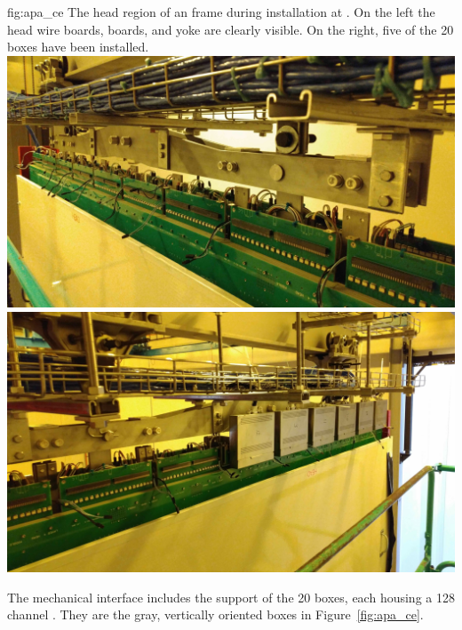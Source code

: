 \begin{dunefigure}{fig:apa_ce}
{The head region of an  frame during installation at .  On the left the head wire boards,  boards, and yoke are clearly visible. On the right, five of the 20  boxes have been installed.}
\includegraphics[height=0.2\textheight]{graphics/sp-apa-yolk-photo.jpg}
\includegraphics[height=0.2\textheight]{graphics/sp-apa-ceboxes-photo.jpg}
\end{dunefigure}

The mechanical interface includes the support of the \num{20}  boxes, each housing a \num{128} channel .  They are the gray, vertically oriented boxes  in Figure~\ref{fig:apa_ce}. 

